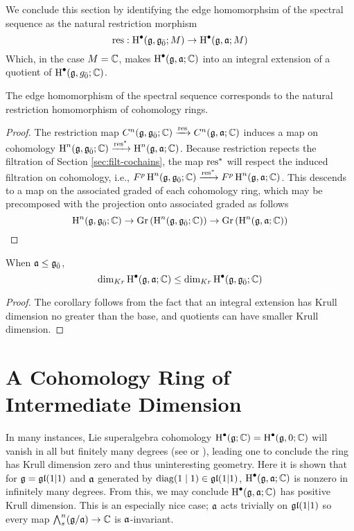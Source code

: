 We conclude this section by identifying the edge homomorphsim of the spectral sequence as the natural restriction morphism
\begin{equation}
  \label{eq:restriction}
  \operatorname{res}: \operatorname{H}^\bullet(\mathfrak{g},{\mathfrak{g}}_{\bar{0}};M) \to \operatorname{H}^\bullet(\mathfrak{g},\mathfrak{a};M)
\end{equation}
Which, in the case $M = \mathbb{C}$, makes $\operatorname{H}^\bullet(\mathfrak{g},\mathfrak{a};\mathbb{C})$ into an integral extension of a quotient of $\operatorname{H}^\bullet(\mathfrak{g},{g}_{\bar{0}};\mathbb{C})$.

\begin{proposition}\label{prop:edge}
  The edge homomorphism of the spectral sequence corresponds to the natural restriction homomorphism of cohomology rings.
\end{proposition}
\begin{proof}
The restriction map $C^n(\mathfrak{g},{\mathfrak{g}}_{\bar{0}};\mathbb{C}) \xrightarrow{\operatorname{res}} C^n(\mathfrak{g},\mathfrak{a};\mathbb{C})$ induces a map on cohomology $\operatorname{H}^n(\mathfrak{g},{\mathfrak{g}}_{\bar{0}};\mathbb{C}) \xrightarrow{\operatorname{res}^*} \operatorname{H}^n(\mathfrak{g},\mathfrak{a};\mathbb{C})$. Because restriction repects the filtration of Section \ref{sec:filt-cochains}, the map $\operatorname{res}^*$ will respect the induced filtration on cohomology, i.e., $F^p \operatorname{H}^n(\mathfrak{g},{\mathfrak{g}}_{\bar{0}};\mathbb{C}) \xrightarrow{\operatorname{res}^*} F^p\operatorname{H}^n(\mathfrak{g},\mathfrak{a};\mathbb{C})$. This descends to a map on the associated graded of each cohomology ring, which may be precomposed with the projection onto associated graded as follows
  \[
    \operatorname{H}^n(\mathfrak{g},{\mathfrak{g}}_{\bar{0}};\mathbb{C}) \to \operatorname{Gr}\left(\operatorname{H}^n(\mathfrak{g},{\mathfrak{g}}_{\bar{0}};\mathbb{C}) \right) \to \operatorname{Gr}\left( \operatorname{H}^n(\mathfrak{g},\mathfrak{a};\mathbb{C}) \right)
  \]

\end{proof}

\begin{corollary}
  When $\mathfrak{a} \leq {\mathfrak{g}}_{\bar{0}}$,
  \[
    \dim_{Kr}\operatorname{H}^\bullet(\mathfrak{g},\mathfrak{a};\mathbb{C}) \leq \dim_{Kr}\operatorname{H}^\bullet(\mathfrak{g},{\mathfrak{g}}_{\bar{0}};\mathbb{C})
  \]
  
\end{corollary}
\begin{proof}
  The corollary follows from the fact that an integral extension has Krull dimension no greater than the base, and quotients can have smaller Krull dimension.
\end{proof}



\section{A Cohomology Ring of Intermediate Dimension}
\label{sec:int-dim}

  In many instances, Lie superalgebra cohomology $\operatorname{H}^\bullet(\mathfrak{g};\mathbb{C}) = \operatorname{H}^\bullet(\mathfrak{g},0;\mathbb{C})$ will vanish in all but finitely many degrees (see \cite{fuks-leites} or \cite[Th\'eor\`eme 5.3]{MR1450424}), leading one to conclude the ring has Krull dimension zero and thus uninteresting geometry. Here it is shown that for $\mathfrak{g} = \mathfrak{gl}(1|1)$ and $\mathfrak{a}$ generated by $\operatorname{diag}(1 \mid 1) \in \mathfrak{gl}(1|1)$, $\operatorname{H}^\bullet(\mathfrak{g},\mathfrak{a};\mathbb{C})$ is nonzero in infinitely many degrees. From this, we may conclude $\operatorname{H}^\bullet(\mathfrak{g},\mathfrak{a};\mathbb{C})$ has positive Krull dimension. This is an especially nice case; $\mathfrak{a}$ acts trivially on $\mathfrak{gl}(1|1)$ so every map $\bigwedge\nolimits^{n}_s(\mathfrak{g}/\mathfrak{a}) \to \mathbb{C}$ is $\mathfrak{a}$-invariant.

